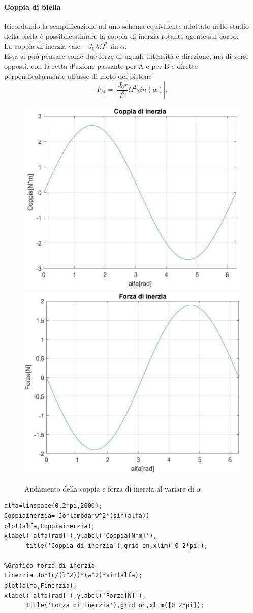 \paragraph{Coppia di biella}
Ricordando la semplificazione ad uno schema equivalente adottato nello studio della biella è possibile stimare la coppia di inerzia rotante agente sul corpo.\\
La coppia di inerzia vale $-J_0\lambda\Omega^2\sin\alpha$.\\
Essa si può pensare come due forze di uguale intensità e direzione, ma di versi opposti, con la retta d’azione passante per A e per B e dirette perpendicolarmente all’asse di moto del pistone 
\begin{equation}
    F_{ci}=\left|\frac{J_0r}{l^2}\Omega^2sin{\left(\alpha\right)}\right|.
    \label{ForzaCoppiaBiella}
\end{equation}
\begin{figure}[h]
\centering
   {\includegraphics[width=.48\textwidth]{Immagini/GraficoCoppiaInerzia.png}} \quad
   {\includegraphics[width=.48\textwidth]{Immagini/GraficoForzaInerzia.png}}
\caption{Andamento della coppia e forza di inerzia al variare di $\alpha$}
\label{fig:GraficoInerziaBiella}
\end{figure}
\begin{lstlisting}[frame=trBL]
%Grafico coppia di inerzia
alfa=linspace(0,2*pi,2000);
Coppiainerzia=-Jo*lambda*w^2*(sin(alfa))
plot(alfa,Coppiainerzia);
xlabel('alfa[rad]'),ylabel('Coppia[N*m]'),
      title('Coppia di inerzia'),grid on,xlim([0 2*pi]);

%Grafico forza di inerzia
Finerzia=Jo*(r/(l^2))*(w^2)*sin(alfa);
plot(alfa,Finerzia);
xlabel('alfa[rad]'),ylabel('Forza[N]'),
      title('Forza di inerzia'),grid on,xlim([0 2*pi]);
\end{lstlisting}
\newpage
